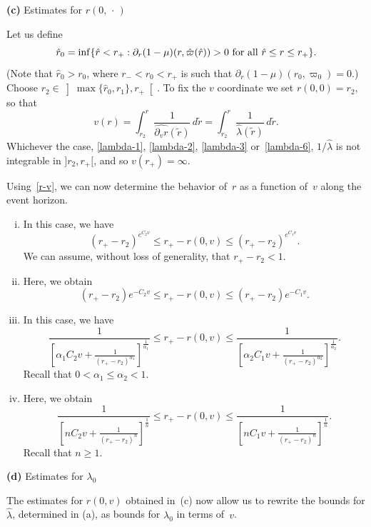 \documentclass[a4paper,11pt,oneside,reqno]{amsart}
\begin{document}
\begin{center}
{\bf (c)} Estimates for $r(0,\,\cdot\,)$
\end{center}
Let us define
\begin{equation}
\label{r0_hat}
\hat r_0=\inf\{\hat r<r_+:\partial_r(1-\mu)(r,\hat\varpi(\hat r))>0\ {\rm for\ all}\ \hat r\leq r\leq r_+\}.
\end{equation}
(Note that $\hat r_0>r_0$, where $r_-<r_0<r_+$ is such that $\partial_r(1-\mu)(r_0,\varpi_0)=0$.)
Choose $r_2 \in\left]\max\{\hat r_0,r_1\},r_+\right[$.
To fix the $v$ coordinate we set $r(0,0)=r_2$, so that
\begin{equation}
\label{r-v}
v(r)=\int_{r_2}^r\frac{1}{\widehat{\partial_v r}(\tilde r)}\,d\tilde r
=\int_{r_2}^r\frac{1}{\hat{\lambda}(\tilde r)}\,d\tilde r.
\end{equation}
Whichever the case,
\eqref{lambda-1}, \eqref{lambda-2}, \eqref{lambda-3} or~\eqref{lambda-6},
 $1/\hat{\lambda}$
is not integrable in $]r_2,r_+[$, and so
$v(r_+)=\infty$. 



Using~\eqref{r-v}, we can now determine the behavior of~$r$ as a function of~$v$ along the event horizon.
\begin{enumerate}[(i)]
\item 
In this case, we have
$$
(r_+-r_2)^{e^{C_2v}}\leq r_+-r(0,v)\leq(r_+-r_2)^{e^{C_1v}}.
$$
We can assume, without loss of generality, that $r_+-r_2<1$.
\item
Here, we obtain
$$
(r_+-r_2)e^{-C_2v}\leq r_+-r(0,v)\leq(r_+-r_2)e^{-C_1v}.
$$
\item
In this case, we have
$$
\frac 1{\left[\alpha_1C_2v+
\frac{1}{(r_+-r_2)^{\alpha_1}}\right]^{\frac{1}{\alpha_1}}}
\leq r_+-r(0,v)\leq
\frac 1{\left[\alpha_2C_1v+
\frac{1}{(r_+-r_2)^{\alpha_2}}\right]^{\frac{1}{\alpha_2}}}.
$$
Recall that $0<\alpha_1\leq\alpha_2<1$.
\item
Here, we obtain
$$
\frac 1{\left[nC_2v+
\frac{1}{(r_+-r_2)^{n}}\right]^{\frac{1}{n}}}
\leq r_+-r(0,v)\leq
\frac 1{\left[nC_1v+
\frac{1}{(r_+-r_2)^{n}}\right]^{\frac{1}{n}}}.
$$
Recall that $n\geq 1$.
\end{enumerate}

\bigskip

\begin{center}
{\bf (d)} Estimates for $\lambda_0$
\end{center}

The estimates for $r(0,v)$ obtained in~(c) now allow us to rewrite the bounds for $\hat{\lambda}$, determined in (a), as bounds for $\lambda_0$ in terms of~$v$.
\end{document}
